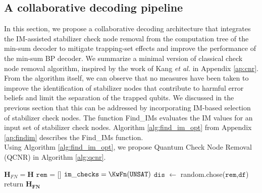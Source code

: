 \documentclass[%
 reprint,
 amsmath,amssymb,
 aps,
pra,
showkeys,
]{revtex4-2}
\begin{document}
\subsection{A collaborative decoding pipeline}
In this section, we propose a collaborative decoding architecture that integrates the IM-assisted stabilizer check node removal from the computation tree of the min-sum decoder to mitigate trapping-set effects and improve the performance of the min-sum BP decoder.
We summarize a minimal version of classical check node removal algorithm, inspired by the work of Kang \emph{et al.} \cite{kang2015breaking} in Appendix \ref{ap:cnr}.
From the algorithm itself, we can observe that no measures have been taken to improve the identification of stabilizer nodes that contribute to harmful error beliefs and limit the separation of the trapped qubits.
We discussed in the previous section that this can be addressed by incorporating IM-based selection of stabilizer check nodes.
The function Find\_IMs evaluates the IM values for an input set of stabilizer check nodes.
Algorithm \ref{alg:find_im_opt} from Appendix \ref{ap:findim} describes the Find\_IMs function.\\
Using Algorithm \ref{alg:find_im_opt}, we propose Quantum Check Node Removal (QCNR) in Algorithm \ref{alg:qcnr}.
\begin{algorithm}
\caption{Quantum Check Node Removal (QCNR)}\label{alg:qcnr}
$\mathbf{H}_{FN} = \mathbf{H}$
$\mathtt{rem}$ = []
$\mathtt{im\_checks} = \KwFn(\mathtt{UNSAT})$\;
$\mathtt{dis}$ $\gets$ random.chose($\mathtt{rem}$,$\mathtt{df}$)\;
return $\mathbf{H_{FN}}$ 
\end{algorithm}
\end{document}
